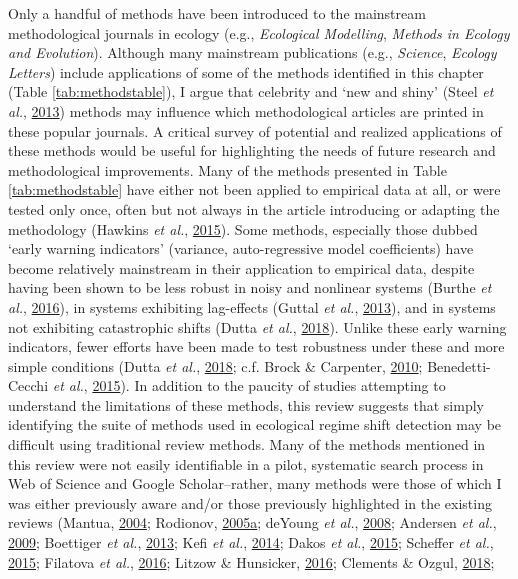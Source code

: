 \documentclass[print]{nuthesis}
\begin{document}
Only a handful of methods have been introduced to the mainstream methodological journals in ecology (e.g., \emph{Ecological Modelling}, \emph{Methods in Ecology and Evolution}). Although many mainstream publications (e.g., \emph{Science}, \emph{Ecology Letters}) include applications of some of the methods identified in this chapter (Table \ref{tab:methodstable}), I argue that celebrity and `new and shiny' (Steel \emph{et al.}, \protect\hyperlink{ref-steel2013applied}{2013}) methods may influence which methodological articles are printed in these popular journals. A critical survey of potential and realized applications of these methods would be useful for highlighting the needs of future research and methodological improvements. Many of the methods presented in Table \ref{tab:methodstable} have either not been applied to empirical data at all, or were tested only once, often but not always in the article introducing or adapting the methodology (Hawkins \emph{et al.}, \protect\hyperlink{ref-hawkins2015ecosystems}{2015}). Some methods, especially those dubbed `early warning indicators' (variance, auto-regressive model coefficients) have become relatively mainstream in their application to empirical data, despite having been shown to be less robust in noisy and nonlinear systems (Burthe \emph{et al.}, \protect\hyperlink{ref-burthe2016early}{2016}), in systems exhibiting lag-effects (Guttal \emph{et al.}, \protect\hyperlink{ref-guttal2013robustness}{2013}), and in systems not exhibiting catastrophic shifts (Dutta \emph{et al.}, \protect\hyperlink{ref-dutta2018robustness}{2018}). Unlike these early warning indicators, fewer efforts have been made to test robustness under these and more simple conditions (Dutta \emph{et al.}, \protect\hyperlink{ref-dutta2018robustness}{2018}; c.f. Brock \& Carpenter, \protect\hyperlink{ref-brock2010interacting}{2010}; Benedetti-Cecchi \emph{et al.}, \protect\hyperlink{ref-benedetti2015experimental}{2015}). In addition to the paucity of studies attempting to understand the limitations of these methods, this review suggests that simply identifying the suite of methods used in ecological regime shift detection may be difficult using traditional review methods. Many of the methods mentioned in this review were not easily identifiable in a pilot, systematic search process in Web of Science and Google Scholar--rather, many methods were those of which I was either previously aware and/or those previously highlighted in the existing reviews (Mantua, \protect\hyperlink{ref-mantua_methods_2004}{2004}; Rodionov, \protect\hyperlink{ref-rodionov_brief_2005}{2005}\protect\hyperlink{ref-rodionov_brief_2005}{a}; deYoung \emph{et al.}, \protect\hyperlink{ref-deyoung_regime_2008}{2008}; Andersen \emph{et al.}, \protect\hyperlink{ref-andersen_ecological_2009}{2009}; Boettiger \emph{et al.}, \protect\hyperlink{ref-boettiger_early_2013}{2013}; Kefi \emph{et al.}, \protect\hyperlink{ref-kefi2014early}{2014}; Dakos \emph{et al.}, \protect\hyperlink{ref-dakos2015resilience}{2015}; Scheffer \emph{et al.}, \protect\hyperlink{ref-scheffer2015generic}{2015}; Filatova \emph{et al.}, \protect\hyperlink{ref-filatova2016regime}{2016}; Litzow \& Hunsicker, \protect\hyperlink{ref-litzow_early_2016}{2016}; Clements \& Ozgul, \protect\hyperlink{ref-clements2018indicators}{2018}; 
\end{document}
